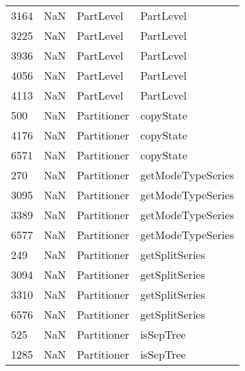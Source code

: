 \begin{tabular}{llll}
3164 &                   NaN &                  PartLevel &                                 PartLevel \\
3225 &                   NaN &                  PartLevel &                                 PartLevel \\
3936 &                   NaN &                  PartLevel &                                 PartLevel \\
4056 &                   NaN &                  PartLevel &                                 PartLevel \\
4113 &                   NaN &                  PartLevel &                                 PartLevel \\
500  &                   NaN &                Partitioner &                                 copyState \\
4176 &                   NaN &                Partitioner &                                 copyState \\
6571 &                   NaN &                Partitioner &                                 copyState \\
270  &                   NaN &                Partitioner &                         getModeTypeSeries \\
3095 &                   NaN &                Partitioner &                         getModeTypeSeries \\
3389 &                   NaN &                Partitioner &                         getModeTypeSeries \\
6577 &                   NaN &                Partitioner &                         getModeTypeSeries \\
249  &                   NaN &                Partitioner &                            getSplitSeries \\
3094 &                   NaN &                Partitioner &                            getSplitSeries \\
3310 &                   NaN &                Partitioner &                            getSplitSeries \\
6576 &                   NaN &                Partitioner &                            getSplitSeries \\
525  &                   NaN &                Partitioner &                                 isSepTree \\
1285 &                   NaN &                Partitioner &                                 isSepTree \\

\end{tabular}
